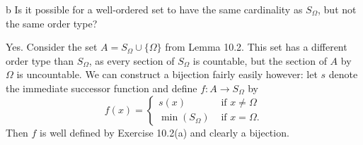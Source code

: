 \documentclass[11pt]{article}
\begin{document}
\begin{p}{b}
  Is it possible for a well-ordered set to have the same cardinality as
  $S_\Omega$, but not the same order type?
\end{p}

\begin{solution}

  Yes. Consider the set $A = S_\Omega \cup \{\Omega\}$ from Lemma 10.2. This set
  has a different order type than $S_\Omega$, as every section of $S_\Omega$ is
  countable, but the section of $A$ by $\Omega$ is uncountable. We can construct
  a bijection fairly easily however: let $s$ denote the immediate successor
  function and define $f: A \to S_\Omega$ by
  \[ f(x) =
    \begin{cases}
      s(x)           &\text{ if $x \neq \Omega$} \\
      \min(S_\Omega) &\text{ if $x = \Omega$}.
    \end{cases}
  \]
  Then $f$ is well defined by Exercise 10.2(a) and clearly a bijection.

\end{solution}
\end{document}
